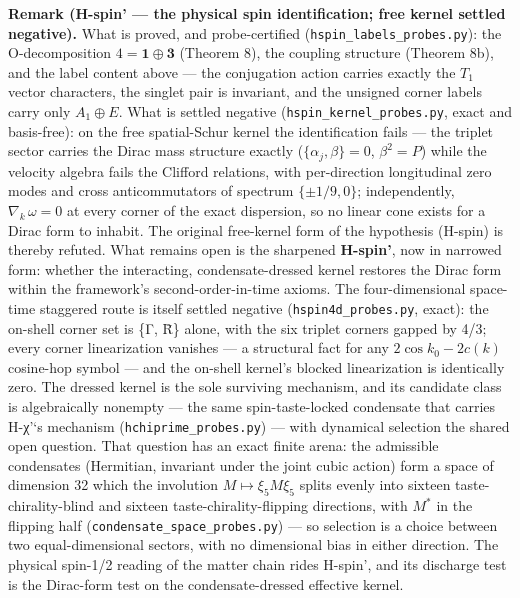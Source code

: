 \documentclass[
]{article}
\begin{document}
\textbf{Remark (H-spin' --- the physical spin identification; free
kernel settled negative).} What is proved, and probe-certified
(\texttt{hspin\_labels\_probes.py}): the O-decomposition
\(4 = \mathbf{1} \oplus \mathbf{3}\) (Theorem 8), the coupling structure
(Theorem 8b), and the label content above --- the conjugation action
carries exactly the \(T_1\) vector characters, the singlet pair is
invariant, and the unsigned corner labels carry only \(A_1 \oplus E\).
What is settled negative (\texttt{hspin\_kernel\_probes.py}, exact and
basis-free): on the free spatial-Schur kernel the identification fails
--- the triplet sector carries the Dirac mass structure exactly
(\(\{\alpha_j, \beta\} = 0\), \(\beta^2 = P\)) while the velocity
algebra fails the Clifford relations, with per-direction longitudinal
zero modes and cross anticommutators of spectrum \(\{\pm 1/9, 0\}\);
independently, \(\nabla_k\, \omega = 0\) at every corner of the exact
dispersion, so no linear cone exists for a Dirac form to inhabit. The
original free-kernel form of the hypothesis (H-spin) is thereby refuted.
What remains open is the sharpened \textbf{H-spin'}, now in narrowed
form: whether the interacting, condensate-dressed kernel restores the
Dirac form within the framework's second-order-in-time axioms. The
four-dimensional space-time staggered route is itself settled negative
(\texttt{hspin4d\_probes.py}, exact): the on-shell corner set is \{Γ,
R̄\} alone, with the six triplet corners gapped by 4/3; every corner
linearization vanishes --- a structural fact for any
\(2\cos k_0 - 2c(k)\) cosine-hop symbol --- and the on-shell kernel's
blocked linearization is identically zero. The dressed kernel is the
sole surviving mechanism, and its candidate class is algebraically
nonempty --- the same spin-taste-locked condensate that carries H-χ'`s
mechanism (\texttt{hchiprime\_probes.py}) --- with dynamical selection
the shared open question. That question has an exact finite arena: the
admissible condensates (Hermitian, invariant under the joint cubic
action) form a space of dimension 32 which the involution
\(M \mapsto \xi_5 M \xi_5\) splits evenly into sixteen
taste-chirality-blind and sixteen taste-chirality-flipping directions,
with \(M^*\) in the flipping half
(\texttt{condensate\_space\_probes.py}) --- so selection is a choice
between two equal-dimensional sectors, with no dimensional bias in
either direction. The physical spin-1/2 reading of the matter chain
rides H-spin', and its discharge test is the Dirac-form test on the
condensate-dressed effective kernel.
\end{document}
